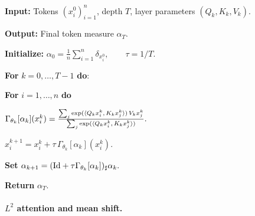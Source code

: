 \begin{alg}\label{alg:residual-attention-depth-evolution}
\textbf{Input:} Tokens $(x_i^0)_{i=1}^n$, depth $T$, layer parameters $(Q_k,K_k,V_k)$.

\textbf{Output:} Final token measure $\alpha_T$.

\textbf{Initialize:}
\(\alpha_0=\frac1n\sum_{i=1}^n\delta_{x_i^0}, \qquad \tau=1/T.\)

\textbf{For} $k=0,\ldots,T-1$ \textbf{do}:
\begin{algblock}

\textbf{For} $i=1,\ldots,n$ \textbf{do}
\begin{algblock}
\(\Gamma_{\theta_k}[\alpha_k](x_i^k) = \frac{\sum_j \exp(\langle Q_kx_i^k,\,K_kx_j^k\rangle)\,V_kx_j^k} {\sum_j \exp(\langle Q_kx_i^k,\,K_kx_j^k\rangle)}.\)

\(x_i^{k+1}=x_i^k+\tau\,\Gamma_{\theta_k}[\alpha_k](x_i^k).\)
\end{algblock}
\textbf{Set}
\(\alpha_{k+1}=(\mathrm{Id}+\tau\Gamma_{\theta_k}[\alpha_k])_\sharp\alpha_k.\)
\end{algblock}
\algreturnskip
\textbf{Return} $\alpha_T$.
\end{alg}


\paragraph{$L^2$ attention and mean shift.}

